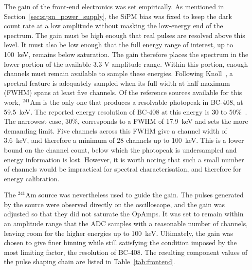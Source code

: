 The gain of the front-end electronics was set empirically. As mentioned in Section~\ref{sec:sipm_power_supply}, the SiPM bias was fixed to keep the dark count rate at a low amplitude without masking the low-energy end of the spectrum. The gain must be high enough that real pulses are resolved above this level. It must also be low enough that the full energy range of interest, up to 100~keV, remains below saturation. The gain therefore places the spectrum in the lower portion of the available 3.3 V amplitude range.
Within this portion, enough channels must remain available to sample these energies. Following Knoll~\cite{14}, a spectral feature is adequately sampled when its full width at half maximum (FWHM) spans at least five channels. Of the reference sources available for this work, $^{241}$Am is the only one that produces a resolvable photopeak in BC-408, at
59.5~keV. The reported energy resolution of BC-408 at this energy is 30 to 50\%~\cite{119,126,127}. The narrowest case, 30\%, corresponds to a FWHM of 17.9~keV and sets the more demanding limit. Five channels across this FWHM give a channel width of 3.6~keV, and therefore a minimum of 28 channels up to 100~keV. This is a lower bound on the channel count, below which the photopeak is undersampled and energy information is lost. However, it is worth noting that such a small number of channels would be impractical for spectral characterisation, and therefore for energy calibration.

The $^{241}$Am source was nevertheless used to guide the gain. The pulses generated by the source were observed directly on the oscilloscope, and the gain was adjusted so that they did not saturate the OpAmps. It was set to remain within an amplitude range that the ADC samples with a reasonable number of channels, leaving room for the higher energies up to 100~keV. Ultimately, the gain was chosen to give finer binning while still satisfying the condition imposed by the most limiting factor, the resolution of BC-408. The resulting component values of the pulse shaping chain are listed in Table~\ref{tab:frontend}.


